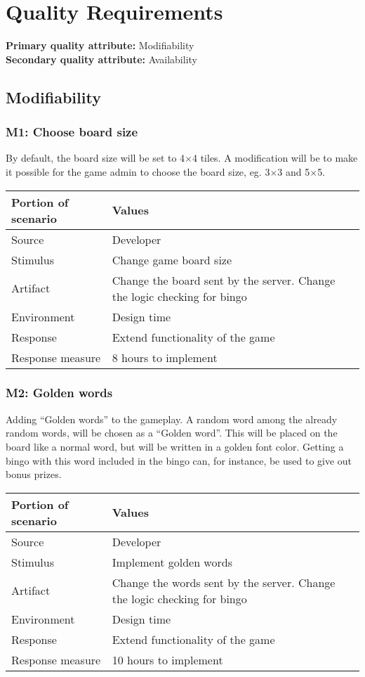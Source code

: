 \section{Quality Requirements}

{\bf Primary quality attribute: } Modifiability\\
{\bf Secondary quality attribute: } Availability

\subsection{Modifiability}

\subsubsection*{M1: Choose board size}
By default, the board size will be set to 4$\times$4 tiles. 
A modification will be to make it possible for the game admin to choose the
board size, eg. 3$\times$3 and 5$\times$5.

\begin{tabular}{|m{}|m{}|}
\hline
{\bf Portion of scenario} & {\bf Values} \\ \hline
Source & Developer \\ \hline
Stimulus & Change game board size \\ \hline
Artifact & Change the board sent by the server. Change the logic
checking for bingo \\ \hline
Environment & Design time \\ \hline
Response & Extend functionality of the game \\ \hline
Response measure & 8 hours to implement \\ \hline
\end{tabular}
\newline

\subsubsection*{M2: Golden words}
Adding ``Golden words'' to the gameplay. A random word among the already random
words, will be chosen as a ``Golden word''. This will be placed on the board
like a normal word, but will be written in a golden font color. Getting a bingo
with this word included in the bingo can, for instance, be used to give out
bonus prizes.

\begin{tabular}{|m{}|m{}|}
\hline
{\bf Portion of scenario} & {\bf Values} \\ \hline
Source & Developer \\ \hline
Stimulus & Implement golden words \\ \hline
Artifact & Change the words sent by the server. Change the logic
checking for bingo \\ \hline
Environment & Design time \\ \hline
Response & Extend functionality of the game \\ \hline
Response measure & 10 hours to implement \\ \hline
\end{tabular}

